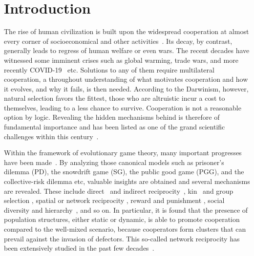 \documentclass[showpacs,superscriptaddress,reprint,nofootinbib,amsmath,amssymb,aps,pre]{revtex4-1}
\begin{document}
\section{Introduction}\label{sec:introduction}
The rise of human civilization is built upon the widespread cooperation at almost every corner of socioeconomical and other activities~\cite{axelrod2006evolution}. Its decay, by contrast, generally leads to regress of human welfare or even wars. The recent decades have witnessed some imminent crises such as global warming, trade wars, and more recently COVID-19~\cite{Covid19} etc. Solutions to any of them require multilateral cooperation, a throughout understanding of what motivates cooperation and how it evolves, and why it fails, is then needed. According to the Darwinism, however, natural selection favors the fittest, those who are altruistic incur a cost to themselves, leading to a less chance to survive. Cooperation is not a reasonable option by logic. Revealing the hidden mechanisms behind is therefore of fundamental importance and has been listed as one of the grand scientific challenges within this century~\cite{Pennisi2005How}.  

Within the framework of evolutionary game theory, many important progresses have been made~\cite{Nowak2006Five,Perc2017Statistical}. By analyzing those canonical models such as prisoner's dilemma (PD), the snowdrift game (SG), the public good game (PGG), and the collective-risk dilemma etc, valuable insights are obtained and several mechanisms are revealed. These include direct~\cite{trivers1971evolution} and indirect reciprocity~\cite{nowak1998evolution}, kin~\cite{hamilton1964genetical} and group selection \cite{keller1999levels,Queller1964Group}, spatial or network reciprocity \cite{nowak1992evolutionary}, reward and punishment \cite{Sigmund2001Reward}, social diversity and hierarchy~\cite{Santos2005Scale-Free,Santos2008Social,Liang2021Social}, and so on. In particular, it is found that the presence of population structures, either static or dynamic, is able to promote cooperation compared to the well-mixed scenario, because cooperators form clusters that can prevail against the invasion of defectors. This so-called network reciprocity has been extensively studied in the past few decades~\cite{szabo2007evolutionary,Wang2015Evolutionary}.
\end{document}
